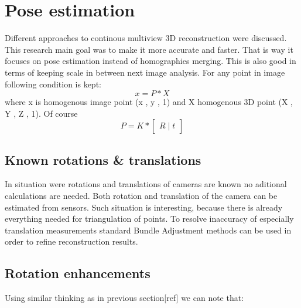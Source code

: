 \section{Pose estimation}
Different approaches to continous multiview 3D reconstruction were discussed. This research main goal was to make it more accurate and faster. That is way it focuses on pose estimation instead of homographies merging. This is also good in terms of keeping scale in between next image analysis. For any point in image following condition is kept:
\begin{equation} \label{eq:projectionEquation}
 x = P * X
\end{equation}
where x is homogenous image point (x , y , 1) and X homogenous 3D  point (X , Y , Z , 1). Of course 
\begin{equation} \label{eq:projectionEquation}
 P = K * \begin{bmatrix}R\mid t\end{bmatrix}
\end{equation}
\subsection{Known rotations \& translations}
In situation were rotations and translations of cameras are known no aditional calculations are needed. Both rotation and translation of the camera can be estimated from sensors. Such situation is interesting, because there is already everything needed for triangulation of points. To resolve inaccuracy of especially translation measurements standard Bundle Adjustment methods can be used in order to refine reconstruction results.
\subsection{Rotation enhancements}
Using similar thinking as in previous section[ref] we can note that:

